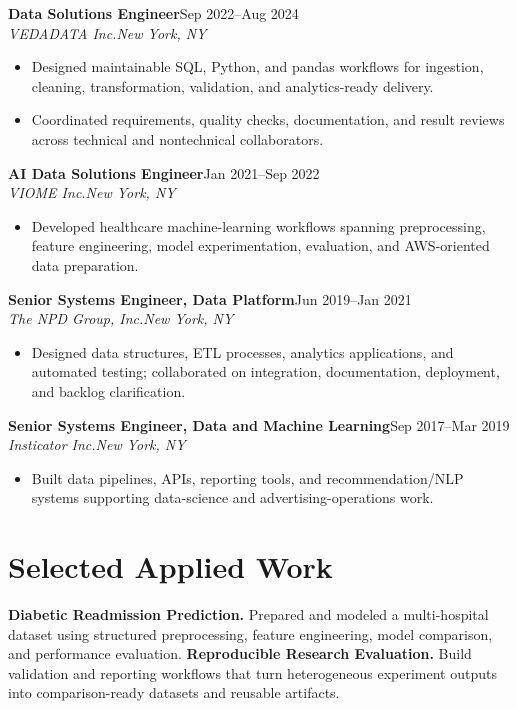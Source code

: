 \documentclass[10pt,letterpaper]{article}
\newcommand{\role}[4]{\textbf{#1}\hfill #2\\\textit{#3}\hfill\textit{#4}\vspace{-3pt}}
\begin{document}
\role{Data Solutions Engineer}{Sep 2022--Aug 2024}
{VEDADATA Inc.}{New York, NY}
\begin{itemize}
  \item Designed maintainable SQL, Python, and pandas workflows for ingestion,
  cleaning, transformation, validation, and analytics-ready delivery.
  \item Coordinated requirements, quality checks, documentation, and result
  reviews across technical and nontechnical collaborators.
\end{itemize}

\role{AI Data Solutions Engineer}{Jan 2021--Sep 2022}
{VIOME Inc.}{New York, NY}
\begin{itemize}
  \item Developed healthcare machine-learning workflows spanning preprocessing,
  feature engineering, model experimentation, evaluation, and AWS-oriented data preparation.
\end{itemize}

\role{Senior Systems Engineer, Data Platform}{Jun 2019--Jan 2021}
{The NPD Group, Inc.}{New York, NY}
\begin{itemize}
  \item Designed data structures, ETL processes, analytics applications, and
  automated testing; collaborated on integration, documentation, deployment,
  and backlog clarification.
\end{itemize}

\role{Senior Systems Engineer, Data and Machine Learning}{Sep 2017--Mar 2019}
{Insticator Inc.}{New York, NY}
\begin{itemize}
  \item Built data pipelines, APIs, reporting tools, and recommendation/NLP
  systems supporting data-science and advertising-operations work.
\end{itemize}

\section*{Selected Applied Work}
\textbf{Diabetic Readmission Prediction.} Prepared and modeled a multi-hospital
dataset using structured preprocessing, feature engineering, model comparison,
and performance evaluation.\quad
\textbf{Reproducible Research Evaluation.} Build validation and reporting
workflows that turn heterogeneous experiment outputs into comparison-ready
datasets and reusable artifacts.
\end{document}
